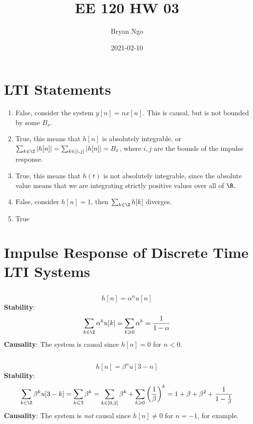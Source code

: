 \documentclass{article}
\title{EE 120 HW 03}
\author{Bryan Ngo}
\date{2021-02-10}
\begin{document}
\maketitle

\section{LTI Statements}

\begin{enumerate}
    \item False, consider the system \(y[n] = nx[n]\). This is causal, but is not bounded by some \(B_x\).
    \item True, this means that \(h[n]\) is absolutely integrable, or \(\sum_{k \in \Z} |h[n]| = \sum_{k \in [i, j]} |h[n]| = B_x\), where \(i, j\) are the bounds of the impulse response.
    \item True, this means that \(h(t)\) is not absolutely integrable, since the absolute value means that we are integrating strictly positive values over all of \(\R\).
    \item False, consider \(h[n] = 1\), then \(\sum_{k \in \Z} h[k]\) diverges.
    \item True %
\end{enumerate}

\section{Impulse Response of Discrete Time LTI Systems}

\subsection{}

\begin{equation}
    h[n] = \alpha^n u[n]
\end{equation}
\textbf{Stability}:
\begin{equation}
    \sum_{k \in \Z} \alpha^k u[k] = \sum_{k \geqslant 0} \alpha^k = \frac{1}{1 - \alpha}
\end{equation}
\textbf{Causality}: The system is causal since \(h[n] = 0\) for \(n < 0\).

\subsection{}

\begin{equation}
    h[n] = \beta^n u[3 - n]
\end{equation}
\textbf{Stability}:
\begin{equation}
    \sum_{k \in \Z} \beta^k u[3 - k] = \sum_{k \leqslant 3} \beta^k = \sum_{k \in [0, 2]} \beta^k + \sum_{k \geqslant 0} \left(\frac{1}{\beta}\right)^k = 1 + \beta + \beta^2 + \frac{1}{1 - \frac{1}{\beta}}
\end{equation}
\textbf{Causality}: The system is \emph{not} causal since \(h[n] \neq 0\) for \(n = -1\), for example.
\end{document}
